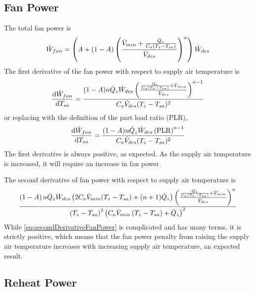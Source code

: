 \subsection{Fan Power}

The total fan power is
\begin{equation}\label{eq:fanPowerForDerivative}
    \dot{W}_{fan} = \left(A + \left(1-A\right)\left(\frac{\dot{V}_{min} + \frac{\dot{Q}_{z}}{C_{a}\left(T_{z}-T_{sa}\right)}{}}{\dot{V}_{des}}\right)^{n}\right) \dot{W}_{des}
\end{equation}
The first derivative of the fan power with respect to supply air
temperature is
\begin{equation}
    \dv{\dot{W}_{fan}}{T_{sa}{}} =\frac{(1-A) n \dot{Q}_{z} \dot{W}_{des}
    \left(\frac{\frac{\dot{Q}_{z}}{C_{a}
(T_{z}-T_{sa}{})}+\dot{V}_{min}}{\dot{V}_{des}}\right)^{n-1}}{C_{a} \dot{V}_{des}
(T_{z}-T_{sa}{})^2} 
\end{equation}
or replacing with the definition of the part load ratio (PLR),
\begin{equation}
    \dv{\dot{W}_{fan}}{T_{sa}{}} =\frac{(1-A) n \dot{Q}_{z} \dot{W}_{des}
    \left( \text{PLR} \right)^{n-1}}{C_{a} \dot{V}_{des}
(T_{z}-T_{sa}{})^2} 
\end{equation}
The first derivative is always positive, as expected. As the supply air
temperature is increased, it will require an increase in fan power.

The second derivative of fan power with respect to supply air
temperature is 
\begin{equation}\label{eq:secondDerivativeFanPower}
    \frac{\left(1-A\right) n \dot{Q}_{z} \dot{W}_{des} \left(2 C_{a}
            \dot{V}_{min}
                    (T_{z}-T_{sa}{})+(n+1) \dot{Q}_{z}\right) \left(\frac{\frac{\dot{Q}_{z}}{C_{a}
                (T_{z}-T_{sa}{})}+\dot{V}_{min}}{\dot{V}_{des}}\right)^n}{\left(T_{z}-T_{sa}{}\right)^2
            \left(C_{a} \dot{V}_{min} \left(T_{z}-T_{sa}{}\right)+\dot{Q}_{z}\right)^2}
\end{equation}
While  \ref{eq:secondDerivativeFanPower} is complicated and
has many terms, it is strictly positive, which means that the fan power
penalty from raising the supply air temperature increases with
increasing supply air temperature, an expected result. 

\subsection{Reheat Power}

